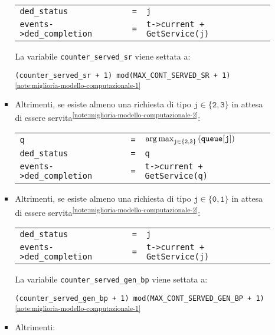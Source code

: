 \begin{enumerate}[label=Step \arabic*), align=left, leftmargin=*]
\begin{itemize}
\begin{itemize}
\begin{center}
\begin{tabular}{l l l}
\texttt{ded\_status} & \texttt{=} & \texttt{j} \\
\texttt{events->ded\_completion} & \texttt{=} & \texttt{t->current + GetService(j)} 
\end{tabular}
\end{center}
{\color{purple}La variabile \texttt{counter\_served\_sr} viene settata a:
\begin{center}
\texttt{(counter\_served\_sr + 1) mod(MAX\_CONT\_SERVED\_SR + 1)}\textsuperscript{\ref{note:miglioria-modello-computazionale-1}}
\end{center}}
\item {\color{purple}Altrimenti, se esiste almeno una richiesta di tipo $\mathtt{j \in \lbrace 2, 3 \rbrace}$ in attesa di essere servita\textsuperscript{\ref{note:miglioria-modello-computazionale-2}}:
\begin{center}
\begin{tabular}{l l l}
\texttt{q} & \texttt{=} & $\mathtt{\operatorname*{arg\,max}_{j \in \lbrace 2, 3 \rbrace}{\left(queue[j]\right)}}$ \\
\texttt{ded\_status} & \texttt{=} & \texttt{q} \\
\texttt{events->ded\_completion} & \texttt{=} & \texttt{t->current + GetService(q)}
\end{tabular}
\end{center}}
\item {\color{purple}Altrimenti, se esiste almeno una richiesta di tipo $\mathtt{j \in \lbrace 0, 1 \rbrace}$ in attesa di essere servita\textsuperscript{\ref{note:miglioria-modello-computazionale-2}}:
\begin{center}
\begin{tabular}{l l l}
\texttt{ded\_status} & \texttt{=} & \texttt{j} \\
\texttt{events->ded\_completion} & \texttt{=} & \texttt{t->current + GetService(j)}
\end{tabular}
\end{center}
La variabile \texttt{counter\_served\_gen\_bp} viene settata a:
\begin{center}
\texttt{(counter\_served\_gen\_bp + 1) mod(MAX\_CONT\_SERVED\_GEN\_BP + 1)}\textsuperscript{\ref{note:miglioria-modello-computazionale-1}}
\end{center}}
\item Altrimenti:
\begin{center}
\begin{tabular}{l l l}

\end{tabular}
\end{center}
\end{itemize}
\end{itemize}
\end{enumerate}
